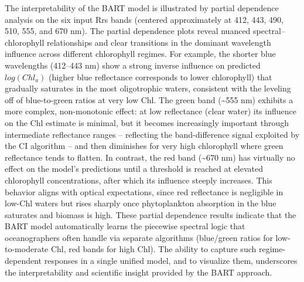 \documentclass[
]{agujournal2019}
\begin{document}
The interpretability of the BART model is illustrated by partial
dependence analysis on the six input Rrs bands (centered approximately
at 412, 443, 490, 510, 555, and 670 nm). The partial dependence plots
reveal nuanced spectral--chlorophyll relationships and clear transitions
in the dominant wavelength influence across different chlorophyll
regimes. For example, the shorter blue wavelengths (412--443 nm) show a
strong inverse influence on predicted \(log(Chl_a)\) (higher blue
reflectance corresponds to lower chlorophyll) that gradually saturates
in the most oligotrophic waters, consistent with the leveling off of
blue-to-green ratios at very low Chl. The green band (\textasciitilde555
nm) exhibits a more complex, non-monotonic effect: at low reflectance
(clear water) its influence on the Chl estimate is minimal, but it
becomes increasingly important through intermediate reflectance ranges
-- reflecting the band-difference signal exploited by the CI algorithm
-- and then diminishes for very high chlorophyll where green reflectance
tends to flatten. In contrast, the red band (\textasciitilde670 nm) has
virtually no effect on the model's predictions until a threshold is
reached at elevated chlorophyll concentrations, after which its
influence steeply increases. This behavior aligns with optical
expectations, since red reflectance is negligible in low-Chl waters but
rises sharply once phytoplankton absorption in the blue saturates and
biomass is high. These partial dependence results indicate that the BART
model automatically learns the piecewise spectral logic that
oceanographers often handle via separate algorithms (blue/green ratios
for low-to-moderate Chl, red bands for high Chl). The ability to capture
such regime-dependent responses in a single unified model, and to
visualize them, underscores the interpretability and scientific insight
provided by the BART approach.
\end{document}
